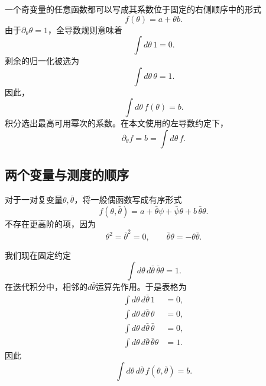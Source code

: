 一个奇变量的任意函数都可以写成其系数位于固定的右侧顺序中的形式
\begin{equation}
f(\theta)=a+\theta b.
\end{equation}
由于\(\partial_\theta\theta=1\)，全导数规则意味着
\begin{equation}
\int d\theta\,1=0.
\end{equation}
剩余的归一化被选为
\begin{equation}
\int d\theta\,\theta=1.
\end{equation}
因此，
\begin{equation}
\int d\theta\,f(\theta)=b.
\end{equation}
积分选出最高可用幂次的系数。在本文使用的左导数约定下，
\begin{equation}
\partial_\theta f=b
=\int d\theta\,f.
\end{equation}

\begin{classroomqa}
\end{classroomqa}

\subsection{两个变量与测度的顺序}

对于一对复变量\(\theta,\bar\theta\)，将一般偶函数写成有序形式
\begin{equation}
f(\theta,\bar\theta)
=a+\bar\theta\psi+\bar\psi\theta+b\,\bar\theta\theta.
\end{equation}
不存在更高阶的项，因为
\begin{equation}
\theta^2=\bar\theta^2=0,
\qquad
\bar\theta\theta=-\theta\bar\theta.
\end{equation}

我们现在固定约定
\begin{equation}
\int d\theta\,d\bar\theta\,
\bar\theta\theta=1.
\end{equation}
在迭代积分中，相邻的\(d\bar\theta\)运算先作用。于是表格为
\begin{align}
\int d\theta\,d\bar\theta\,1&=0,\\
\int d\theta\,d\bar\theta\,\theta&=0,\\
\int d\theta\,d\bar\theta\,\bar\theta&=0,\\
\int d\theta\,d\bar\theta\,\bar\theta\theta&=1.
\end{align}
因此
\begin{equation}
\int d\theta\,d\bar\theta\,
f(\theta,\bar\theta)=b.
\end{equation}

